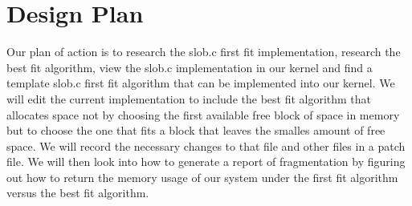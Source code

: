 \documentclass[onecolumn, draftclsnofoot,10pt, compsoc]{IEEEtran}
\begin{document}


\section{Design Plan}

		Our plan of action is to research the slob.c first fit implementation, research the best fit algorithm, view the slob.c implementation in our kernel and find a template slob.c 
		first fit algorithm that can be implemented into our kernel. We will edit the current implementation to include the best fit algorithm that allocates space not by choosing
		the first available free block of space in memory but to choose the one that fits a block that leaves the smalles amount of free space. We will record the necessary changes to that 
		file and other files in a patch file. We will then look into how to generate a report of fragmentation by figuring out how to return the memory usage of our system under the 
		first fit algorithm versus the best fit algorithm.
	
\end{document}
